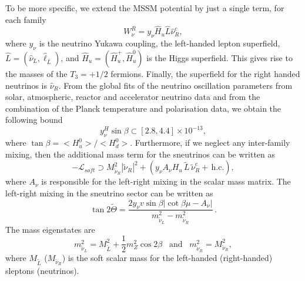 \documentclass[10pt]{article}
\begin{document}
To be more specific, we extend the MSSM potential by just a single term, for each family
\begin{equation}
W_{\nu}^R = y_{\nu} \hat{H}_u \hat{L} \hat{\nu}^c_R,
\end{equation}
where $y_{\nu}$ is the neutrino Yukawa coupling, the left-handed lepton superfield, $\hat{L}=(\hat{\nu}_L,\hat{\ell}_{\bar{L}})$, and $\hat{H}_u = (\hat{H}^+_u, \hat{H}^0_u)$ is the Higgs superfield. This gives rise to the masses of the $T_3 = +1/2$ fermions. Finally, the superfield for the right handed neutrinos is $\hat{\nu}_R$. From the global fits of the neutrino oscillation parameters from solar, atmospheric, reactor and accelerator neutrino data and from the combination of the Planck temperature and polarisation data, we obtain the following bound
\begin{equation}
y_\nu^H \sin{\beta} \subset [2.8, 4.4] \times 10^{-13},
\end{equation}
where $\tan{\beta} = \big< H_u^0 \big>/ \big< H_d^0 \big>$. Furthermore, if we neglect any inter-family mixing, then the additional mass term for the sneutrinos can be written as
\begin{equation}
-\mathcal{L}_{soft} \supset M_{\tilde{\nu}_R}^2 |\tilde{\nu}_R|^2 + (y_{\nu} A_{\nu} H_u \, \tilde{L}\, \tilde{\nu}_R^c + \, \text{h.c.}),
\end{equation}
where $A_\nu$ is responsible for the left-right mixing in the scalar mass matrix. The left-right mixing in the sneutrino sector can be written as
\begin{equation}
\tan{2\tilde\Theta} = \frac{2 y_{\nu} v \sin{\beta} |\cot{\beta} \mu - A_{\nu}|}{m_{\tilde{\nu}_L}^2 - m_{\tilde{\nu}_R}^2}\,.
\label{eq:mixing}
\end{equation}
The mass eigenstates are
\begin{equation}
m_{\tilde{\nu}_L}^2 = M_{\tilde{L}}^2 + \frac{1}{2} m_Z^2 \cos{2\beta} \;\;\; \textrm{and} \;\;\; m_{\tilde{\nu}_R}^2 = M_{\tilde{\nu}_R}^2,
\end{equation}
where $M_{\tilde{L}}$ ($M_{\tilde{\nu}_R}$) is the soft scalar mass for the left-handed (right-handed) sleptons (neutrinos).
\end{document}
